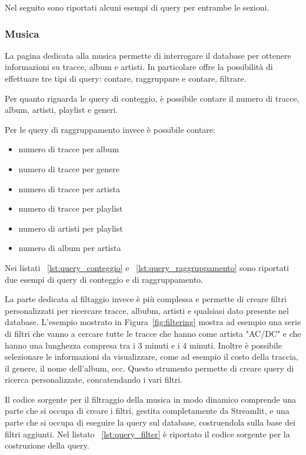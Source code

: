 \documentclass{article}
\begin{document}
Nel seguito sono riportati alcuni esempi di query per entrambe le sezioni.

\subsubsection{Musica}
La pagina dedicata alla musica permette di interrogare il database per ottenere informazioni su tracce, album e artisti. In particolare offre la possibilità di effettuare
tre tipi di query: contare, raggruppare e contare, filtrare. 

Per quanto riguarda le query di conteggio, è possibile contare il numero di tracce, album, artisti, playlist e generi.

Per le query di raggruppamento invece è possibile contare: 
\begin{itemize}
    \item numero di tracce per album
    \item numero di tracce per genere
    \item numero di tracce per artista
    \item numero di tracce per playlist
    \item numero di artisti per playlist
    \item numero di album per artista
\end{itemize}

Nei listati ~\ref{lst:query_conteggio} e ~\ref{lst:query_raggruppamento} sono riportati due esempi di query di conteggio e di raggruppamento.

La parte dedicata al filtaggio invece è più complessa e permette di creare filtri personalizzati per ricercare tracce, albubm, artisti e qualsiasi dato presente nel database. L'esempio mostrato in Figura~\ref{fig:filtering}
mostra ad esempio una serie di filtri che vanno a cercare tutte le tracce che hanno come artista "AC/DC" e che hanno una lunghezza compresa tra i 3 minuti e i 4 minuti. Inoltre è possibile selezionare
le informazioni da visualizzare, come ad esempio il costo della traccia, il genere, il nome dell'album, ecc. Questo strumento permette di creare query di ricerca personalizzate, concatendando i vari filtri.

Il codice sorgente per il filtraggio della musica in modo dinamico comprende una parte che si occupa di creare i filtri, gestita
completamente da Streamlit, e una parte che si occupa di eseguire la query sul database, costruendola sulla base dei filtri aggiunti.
Nel listato ~\ref{lst:query_filter} è riportato il codice sorgente per la costruzione della query.
\end{document}
